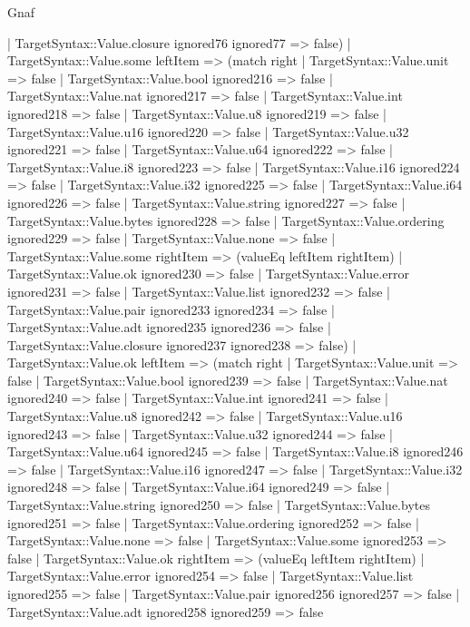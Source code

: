 \begin{lexlean}{Gnaf}
\begin{semanticmodule}
{      | TargetSyntax::Value.closure ignored76 ignored77 => false)
    | TargetSyntax::Value.some leftItem => (match right
      | TargetSyntax::Value.unit => false
      | TargetSyntax::Value.bool ignored216 => false
      | TargetSyntax::Value.nat ignored217 => false
      | TargetSyntax::Value.int ignored218 => false
      | TargetSyntax::Value.u8 ignored219 => false
      | TargetSyntax::Value.u16 ignored220 => false
      | TargetSyntax::Value.u32 ignored221 => false
      | TargetSyntax::Value.u64 ignored222 => false
      | TargetSyntax::Value.i8 ignored223 => false
      | TargetSyntax::Value.i16 ignored224 => false
      | TargetSyntax::Value.i32 ignored225 => false
      | TargetSyntax::Value.i64 ignored226 => false
      | TargetSyntax::Value.string ignored227 => false
      | TargetSyntax::Value.bytes ignored228 => false
      | TargetSyntax::Value.ordering ignored229 => false
      | TargetSyntax::Value.none => false
      | TargetSyntax::Value.some rightItem => (valueEq leftItem rightItem)
      | TargetSyntax::Value.ok ignored230 => false
      | TargetSyntax::Value.error ignored231 => false
      | TargetSyntax::Value.list ignored232 => false
      | TargetSyntax::Value.pair ignored233 ignored234 => false
      | TargetSyntax::Value.adt ignored235 ignored236 => false
      | TargetSyntax::Value.closure ignored237 ignored238 => false)
    | TargetSyntax::Value.ok leftItem => (match right
      | TargetSyntax::Value.unit => false
      | TargetSyntax::Value.bool ignored239 => false
      | TargetSyntax::Value.nat ignored240 => false
      | TargetSyntax::Value.int ignored241 => false
      | TargetSyntax::Value.u8 ignored242 => false
      | TargetSyntax::Value.u16 ignored243 => false
      | TargetSyntax::Value.u32 ignored244 => false
      | TargetSyntax::Value.u64 ignored245 => false
      | TargetSyntax::Value.i8 ignored246 => false
      | TargetSyntax::Value.i16 ignored247 => false
      | TargetSyntax::Value.i32 ignored248 => false
      | TargetSyntax::Value.i64 ignored249 => false
      | TargetSyntax::Value.string ignored250 => false
      | TargetSyntax::Value.bytes ignored251 => false
      | TargetSyntax::Value.ordering ignored252 => false
      | TargetSyntax::Value.none => false
      | TargetSyntax::Value.some ignored253 => false
      | TargetSyntax::Value.ok rightItem => (valueEq leftItem rightItem)
      | TargetSyntax::Value.error ignored254 => false
      | TargetSyntax::Value.list ignored255 => false
      | TargetSyntax::Value.pair ignored256 ignored257 => false
      | TargetSyntax::Value.adt ignored258 ignored259 => false
}
\end{semanticmodule}
\end{lexlean}
